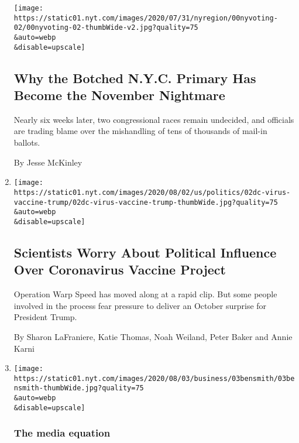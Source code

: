 \begin{enumerate}
  \texttt{[image: https://static01.nyt.com/images/2020/07/31/nyregion/00nyvoting-02/00nyvoting-02-thumbWide-v2.jpg?quality=75\\\&auto=webp\\\&disable=upscale]}

  \hypertarget{why-the-botched-nyc-primary-has-become-the-november-nightmare}{%
  \subsection{Why the Botched N.Y.C. Primary Has Become the November
  Nightmare}\label{why-the-botched-nyc-primary-has-become-the-november-nightmare}}

  Nearly six weeks later, two congressional races remain undecided, and
  officials are trading blame over the mishandling of tens of thousands
  of mail-in ballots.

  By Jesse McKinley
\item
  \href{/2020/08/02/us/politics/coronavirus-vaccine.html}{}

  \texttt{[image: https://static01.nyt.com/images/2020/08/02/us/politics/02dc-virus-vaccine-trump/02dc-virus-vaccine-trump-thumbWide.jpg?quality=75\\\&auto=webp\\\&disable=upscale]}

  \hypertarget{scientists-worry-about-political-influence-over-coronavirus-vaccine-project}{%
  \subsection{Scientists Worry About Political Influence Over
  Coronavirus Vaccine
  Project}\label{scientists-worry-about-political-influence-over-coronavirus-vaccine-project}}

  Operation Warp Speed has moved along at a rapid clip. But some people
  involved in the process fear pressure to deliver an October surprise
  for President Trump.

  By Sharon LaFraniere, Katie Thomas, Noah Weiland, Peter Baker and
  Annie Karni
\item
  \href{/2020/08/02/business/media/election-coverage.html}{}

  \texttt{[image: https://static01.nyt.com/images/2020/08/03/business/03bensmith/03bensmith-thumbWide.jpg?quality=75\\\&auto=webp\\\&disable=upscale]}

  \hypertarget{the-media-equation}{%
  \subsubsection{The media equation}\label{the-media-equation}}


\end{enumerate}
